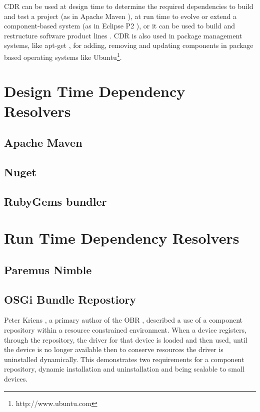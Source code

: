 CDR can be used at design time to determine the required dependencies to build and test a project (as in Apache Maven \cite{casey_better_2008}),
at run time to evolve or extend a component-based system (as in Eclipse P2 \cite{leBerre2010}),
or it can be used to build and restructure software product lines \cite{savolainen_analyzing_2007}.
CDR is also used in package management systems, like apt-get \cite{Barth2005},
for adding, removing and updating components in package based operating systems like Ubuntu\footnote{http://www.ubuntu.com}. 


\section{Design Time Dependency Resolvers}

\subsection{Apache Maven}

\subsection{Nuget} 

\subsection{RubyGems bundler}

\section{Run Time Dependency Resolvers}
\subsection{Paremus Nimble}

\subsection{OSGi Bundle Repostiory}
Peter Kriens \cite{kriens_osgi_2008}, 
a primary author of the OBR \cite{the_osgi_alliance_rfc-0112_2006}, described a use of a component repository within a resource constrained environment.
When a device registers, 
through the repository, the driver for that device is loaded and then used, until the device is no longer available
then to conserve resources the driver is uninstalled dynamically. 
This demonstrates two requirements for a component repository, dynamic installation and uninstallation and being scalable to small devices.

